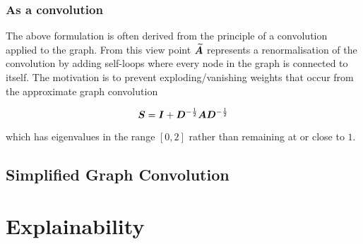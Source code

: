 \subsubsection{As a convolution}

The above formulation is often derived from the principle of a convolution applied to the graph.
From this view point $\widetilde{{\bm{A}}}$ represents a renormalisation of the convolution by adding self-loops where every node in the graph is connected to itself.
The motivation is to prevent exploding/vanishing weights that occur from the approximate graph convolution

\begin{equation}
    {\bm{S}} = {\bm{I}} + {\bm{D}}^{-\frac12}{\bm{A}}{\bm{D}}^{-\frac12}
\end{equation}

which has eigenvalues in the range $[0,2]$ rather than remaining at or close to $1$.







\subsection{Simplified Graph Convolution}





\section{Explainability}


